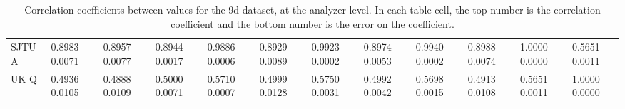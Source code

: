 \begin{landscape}
\begin{table}
\begin{tabularx}{1\linewidth}{@{\extracolsep{\fill}}lXXXXXXXXXXX}
	SJTU A & 0.8983 0.0071 & 0.8957 0.0077 & 0.8944 0.0017 & 0.9886 0.0006 & 0.8929 0.0089 & 0.9923 0.0002 & 0.8974 0.0053 & 0.9940 0.0002 & 0.8988 0.0074 & 1.0000 0.0000 & 0.5651 0.0011  \\
	UK Q   & 0.4936 0.0105 & 0.4888 0.0109 & 0.5000 0.0071 & 0.5710 0.0007 & 0.4999 0.0128 & 0.5750 0.0031 & 0.4992 0.0042 & 0.5698 0.0015 & 0.4913 0.0108 & 0.5651 0.0011 & 1.0000 0.0000  \\
  \bottomrule
\end{tabularx}
\caption[]{Correlation coefficients between \R values for the 9d dataset, at the analyzer level. In each table cell, the top number is the correlation coefficient and the bottom number is the error on the coefficient.}
\label{tab:Corrs_9d_analyzer}
\end{table}
\end{landscape}





